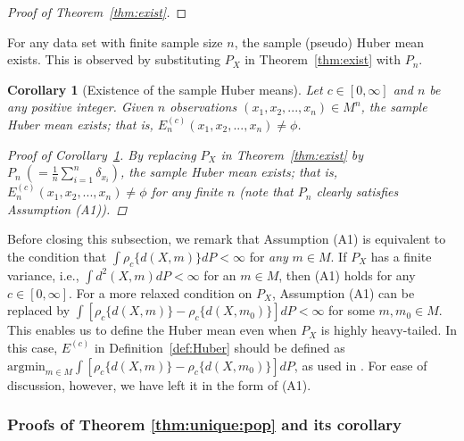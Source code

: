 \documentclass[preprint]{imsart}
\theoremstyle{plain}
\newtheorem{corollary}{Corollary}
\theoremstyle{remark}
\begin{document}
\begin{appendix}
\begin{proof}[Proof of Theorem~\ref{thm:exist}]
\end{proof}






For any data set with finite sample size $n$, the sample (pseudo) Huber mean exists. This is observed by substituting $P_{X}$ in Theorem~\ref{thm:exist} with $P_{n}$.



\begin{corollary}[Existence of the sample Huber means]\label{cor:exist:sam}
 Let $c \in [0, \infty]$ and $n$ be any positive integer. Given $n$ observations $(x_{1}, x_{2}, ..., x_{n}) \in M^{n}$, the sample Huber mean exists; that is, $E_{n}^{(c)}(x_{1}, x_{2}, ..., x_{n}) \neq \phi$.
\begin{proof}[Proof of Corollary~\ref{cor:exist:sam}]
By replacing $P_{X}$ in Theorem~\ref{thm:exist} by $P_{n} ~(=\frac{1}{n}\sum_{i=1}^{n} \delta_{x_{i}})$, the sample Huber mean exists; that is, $E_{n}^{(c)}(x_{1}, x_{2}, ..., x_{n}) \neq \phi$ for any finite $n$ (note that $P_{n}$ clearly satisfies Assumption (A1)).
\end{proof}
\end{corollary}






Before closing this subsection, we remark that Assumption (A1) is equivalent to the condition that $\int \rho_{c}\{d(X, m)\}dP < \infty$ for \textit{any} $m \in M$. If $P_X$ has a finite variance, i.e., $\int d^2(X, m)dP < \infty$ for an $m\in M$, then (A1) holds for any $c \in [0, \infty]$. %
For a more relaxed condition on $P_{X}$, Assumption (A1) can be replaced by $\int [\rho_{c}\{d(X, m)\} - \rho_c\{d(X, m_0)\}]dP < \infty$ for some $m, m_0\in M$. This enables us to define the Huber mean even when $P_{X}$ is highly heavy-tailed. In this case, $E^{(c)}$ in Definition~\ref{def:Huber} should be defined as $\mbox{argmin}_{m \in M} \int [\rho_c\{d(X, m)\} - \rho_c\{d(X, m_0)\}]dP$, as used in \cite{sturm2003probability, schotz2022strong, schotz2025variance}. For ease of discussion, however, we have left it in the form of (A1).


\subsubsection{Proofs of Theorem \ref{thm:unique:pop} and its corollary}


\end{appendix}
\end{document}
